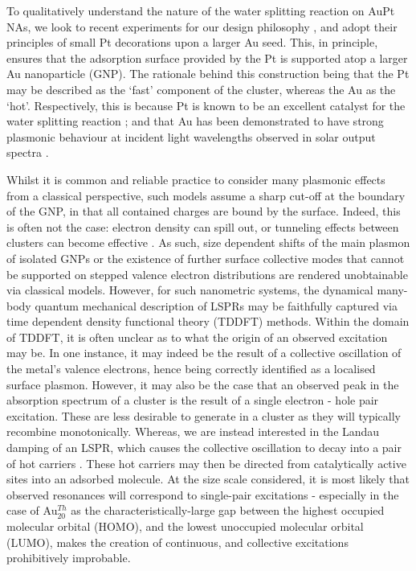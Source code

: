 To qualitatively understand the nature of the water splitting reaction on AuPt NAs, we look to recent experiments for our design philosophy \cite{JorgeStructure,Anton,RationalDesign}, and adopt their principles of small Pt decorations upon a larger Au seed. This, in principle, ensures that the adsorption surface provided by the Pt is supported atop a larger Au nanoparticle (GNP). The rationale behind this construction being that the Pt may be described as the `fast' component of the cluster, whereas the Au as the `hot'. Respectively, this is because Pt is known to be an excellent catalyst for the water splitting reaction \cite{PtCatalyst}; and that Au has been demonstrated to have strong plasmonic behaviour at incident light wavelengths observed in solar output spectra \cite{AuTRansfer,SolarToChem}.

Whilst it is common and reliable practice to consider many plasmonic effects from a classical perspective, such models assume a sharp cut-off at the boundary of the GNP, in that all contained charges are bound by the surface. Indeed, this is often not the case: electron density can spill out, or tunneling effects between clusters can become effective \cite{PlasmonTunneling}. As such, size dependent shifts of the main plasmon of isolated GNPs or the existence of further surface collective modes that cannot be supported on stepped valence electron distributions are rendered unobtainable via classical models. However, for such nanometric systems, the dynamical many-body quantum mechanical description of LSPRs  may be faithfully captured via time dependent density functional theory (TDDFT) methods. Within the domain of TDDFT, it is often unclear as to what the origin of an observed excitation may be. In one instance, it may indeed be the result of a collective oscillation of the metal's valence electrons, hence being correctly identified as a localised surface plasmon. However, it may also be the case that an observed peak in the absorption spectrum of a cluster is the result of a single electron - hole pair excitation. These are less desirable to generate in a cluster as they will typically recombine monotonically. Whereas, we are instead interested in the Landau damping of an LSPR, which causes the collective oscillation to decay into a pair of hot carriers \cite{ExtractHotCars}. These hot carriers may then be directed from catalytically active sites into an adsorbed molecule. At the size scale considered, it is most likely that observed resonances will correspond to single-pair excitations \cite{SizeLSPR} - especially in the case of Au$_{20}^{Th}$ as the characteristically-large gap between the highest occupied molecular orbital (HOMO), and the lowest unoccupied molecular orbital (LUMO), makes the creation of continuous, and collective excitations prohibitively improbable.

